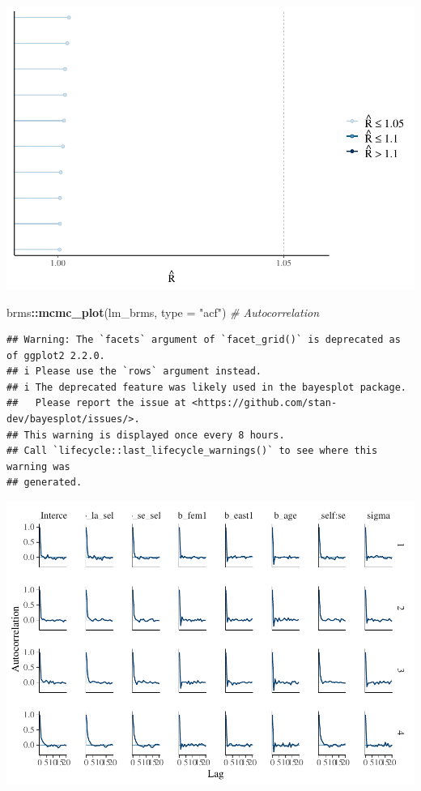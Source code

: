 \documentclass[
  11pt,
]{article}
\newenvironment{Shaded}{\begin{snugshade}}{\end{snugshade}}
\newcommand{\AttributeTok}[1]{\textcolor[rgb]{0.13,0.29,0.53}{#1}}
\newcommand{\CommentTok}[1]{\textcolor[rgb]{0.56,0.35,0.01}{\textit{#1}}}
\newcommand{\FunctionTok}[1]{\textcolor[rgb]{0.13,0.29,0.53}{\textbf{#1}}}
\newcommand{\NormalTok}[1]{#1}
\newcommand{\SpecialCharTok}[1]{\textcolor[rgb]{0.81,0.36,0.00}{\textbf{#1}}}
\newcommand{\StringTok}[1]{\textcolor[rgb]{0.31,0.60,0.02}{#1}}
\begin{document}
\includegraphics{02-02-lec_files/figure-latex/brms-visual-1.pdf}

\begin{Shaded}
\begin{Highlighting}[]
\NormalTok{brms}\SpecialCharTok{::}\FunctionTok{mcmc\_plot}\NormalTok{(lm\_brms, }\AttributeTok{type =} \StringTok{"acf"}\NormalTok{)   }\CommentTok{\# Autocorrelation}
\end{Highlighting}
\end{Shaded}

\begin{verbatim}
## Warning: The `facets` argument of `facet_grid()` is deprecated as of ggplot2 2.2.0.
## i Please use the `rows` argument instead.
## i The deprecated feature was likely used in the bayesplot package.
##   Please report the issue at <https://github.com/stan-dev/bayesplot/issues/>.
## This warning is displayed once every 8 hours.
## Call `lifecycle::last_lifecycle_warnings()` to see where this warning was
## generated.
\end{verbatim}

\includegraphics{02-02-lec_files/figure-latex/brms-visual-2.pdf}
\end{document}
